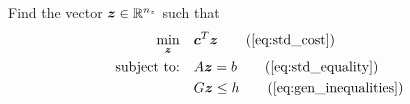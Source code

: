 \documentclass[10pt]{article}
\begin{document}
\begin{problem}
Find the vector $\bm{z}\in{\mathbb{R}}^{n_z}$ such that
\begin{subequations}\label{eq:prob2}
\begin{align}
\min_{\bm{z}} &\quad \bm{c}^T \bm{z} \tag{\ref{eq:std_cost}}\\
\text{subject to:} &\quad A \bm{z} = b \tag{\ref{eq:std_equality}} \\
&\quad G \bm{z} \leq h \tag{\ref{eq:gen_inequalities}}
\end{align}
\end{subequations}
\end{problem}


\end{document}
